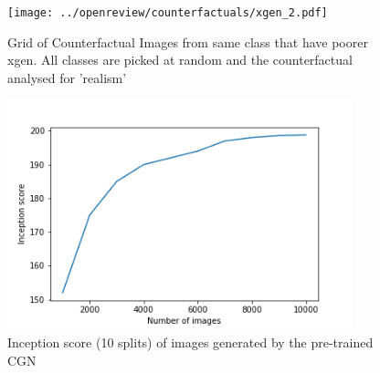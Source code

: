 \begin{figure}[ht!]
\centering 
    \texttt{[image: ../openreview/counterfactuals/xgen\_2.pdf]}
    \caption{Grid of Counterfactual Images from same class that have poorer x{gen}.
    All classes are picked at random and the counterfactual analysed for 'realism'}
    \label{fig:poor_counterfactuals}
\end{figure}

\begin{figure}[h!]
    \centering
    \includegraphics[width=10cm]{../openreview/images/inception.png}
    \caption{Inception score (10 splits) of images generated by the pre-trained CGN}
    \label{fig:inception}
\end{figure}

\newpage

